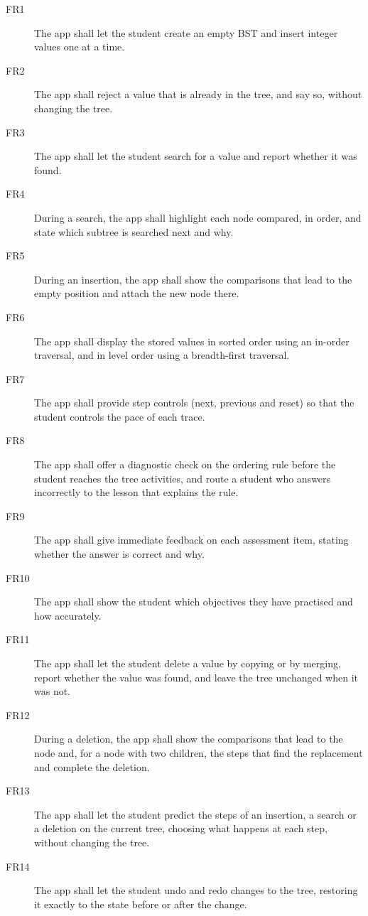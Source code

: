 \begin{description}
    \item[FR1] The app shall let the student create an empty BST and insert integer values one at a time.
    \item[FR2] The app shall reject a value that is already in the tree, and say so, without changing the tree.
    \item[FR3] The app shall let the student search for a value and report whether it was found.
    \item[FR4] During a search, the app shall highlight each node compared, in order, and state which subtree is searched next and why.
    \item[FR5] During an insertion, the app shall show the comparisons that lead to the empty position and attach the new node there.
    \item[FR6] The app shall display the stored values in sorted order using an in-order traversal, and in level order using a breadth-first traversal.
    \item[FR7] The app shall provide step controls (next, previous and reset) so that the student controls the pace of each trace.
    \item[FR8] The app shall offer a diagnostic check on the ordering rule before the student reaches the tree activities, and route a student who answers incorrectly to the lesson that explains the rule.
    \item[FR9] The app shall give immediate feedback on each assessment item, stating whether the answer is correct and why.
    \item[FR10] The app shall show the student which objectives they have practised and how accurately.
    \item[FR11] The app shall let the student delete a value by copying or by merging, report whether the value was found, and leave the tree unchanged when it was not.
    \item[FR12] During a deletion, the app shall show the comparisons that lead to the node and, for a node with two children, the steps that find the replacement and complete the deletion.
    \item[FR13] The app shall let the student predict the steps of an insertion, a search or a deletion on the current tree, choosing what happens at each step, without changing the tree.
    \item[FR14] The app shall let the student undo and redo changes to the tree, restoring it exactly to the state before or after the change.
\end{description}

